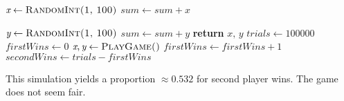 \documentclass[answers]{exam}
\begin{document}
\begin{questions}
\begin{solution}
\begin{algorithmic}
				\State $\textit{x} \gets \textsc{RandomInt(1, 100)}$
				\State $\textit{sum} \gets \textit{sum} + \textit{x}$
				\EndWhile

				\State $\textit{y} \gets \textsc{RandomInt(1, 100)}$
				\State $\textit{sum} \gets \textit{sum} + \textit{y}$
				\EndWhile
				\State \textbf{return} $\textit{x, y}$
			\EndFunction
			\State
			\State $\textit{trials} \gets 100000$
			\State $\textit{firstWins} \gets 0$
				\State $\textit{x}, \textit{y} \gets \textsc{PlayGame()}$
				\State $\textit{firstWins} \gets \textit{firstWins} + 1$
				\EndIf
			\EndFor
			\State $\textit{secondWins} \gets \textit{trials} - \textit{firstWins}$ 
		\end{algorithmic}
		This simulation yields a proportion $\approx 0.532$ for second player wins. The game does not seem fair.
	\end{solution}
\end{questions}
\end{document}
